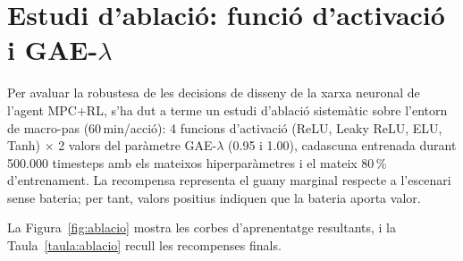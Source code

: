 \documentclass[a4paper,12pt,twoside]{ThesisStyle}
\begin{document}
\section{Estudi d'ablació: funció d'activació i GAE-$\lambda$}
\label{sec:ablacio}

Per avaluar la robustesa de les decisions de disseny de la xarxa neuronal de l'agent MPC+RL, s'ha dut a terme un estudi d'ablació sistemàtic sobre l'entorn de macro-pas (60\,min/acció): 4 funcions d'activació (ReLU, Leaky ReLU, ELU, Tanh) $\times$ 2 valors del paràmetre GAE-$\lambda$ (0.95 i 1.00), cadascuna entrenada durant 500.000 timesteps amb els mateixos hiperparàmetres i el mateix 80\,\% d'entrenament. La recompensa representa el guany marginal respecte a l'escenari sense bateria; per tant, valors positius indiquen que la bateria aporta valor.

La Figura~\ref{fig:ablacio} mostra les corbes d'aprenentatge resultants, i la Taula~\ref{taula:ablacio} recull les recompenses finals.
\end{document}
